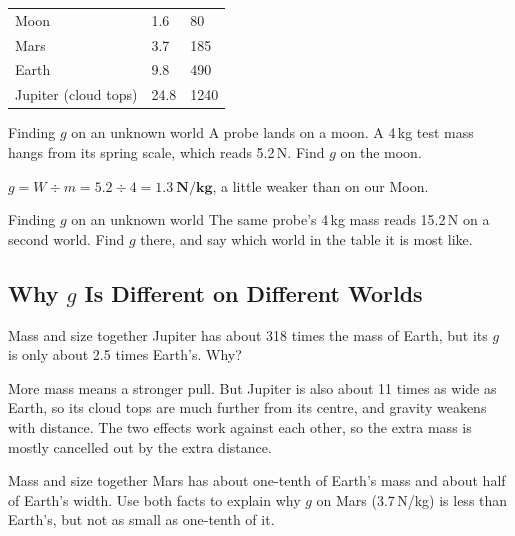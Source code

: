 \begin{ctab}
\begin{tabular}{|C{3.0cm}|C{3.8cm}|C{3.8cm}|}
  \hline{} &  &  \\ \hline
  Moon & 1.6 & 80 \\ \hline
  Mars & 3.7 & 185 \\ \hline
  Earth & 9.8 & 490 \\ \hline
  Jupiter (cloud tops) & 24.8 & 1240 \\ \hline
\end{tabular}
\end{ctab}

\begin{workedex}{Finding $g$ on an unknown world}
A probe lands on a moon. A 4\,kg test mass hangs from its spring scale, which reads 5.2\,N. Find $g$ on the moon.

\smallskip
$g = W \div m = 5.2 \div 4 = \mathbf{1.3\ \text{N/kg}}$, a little weaker than on our Moon.
\end{workedex}

\begin{wedo}{Finding $g$ on an unknown world}
The same probe's 4\,kg mass reads 15.2\,N on a second world. Find $g$ there, and say which world in the table it is most like.
\end{wedo}

\subsection{Why $g$ Is Different on Different Worlds}\label{sub:a1.2}

\begin{workedex}{Mass and size together}
Jupiter has about 318 times the mass of Earth, but its $g$ is only about 2.5 times Earth's. Why?

\smallskip
More mass means a stronger pull. But Jupiter is also about 11 times as wide as Earth, so its cloud tops are much further from its centre, and gravity weakens with distance. The two effects work against each other, so the extra mass is mostly cancelled out by the extra distance.
\end{workedex}

\begin{wedo}{Mass and size together}
Mars has about one-tenth of Earth's mass and about half of Earth's width. Use both facts to explain why $g$ on Mars (3.7\,N/kg) is less than Earth's, but not as small as one-tenth of it.
\end{wedo}


